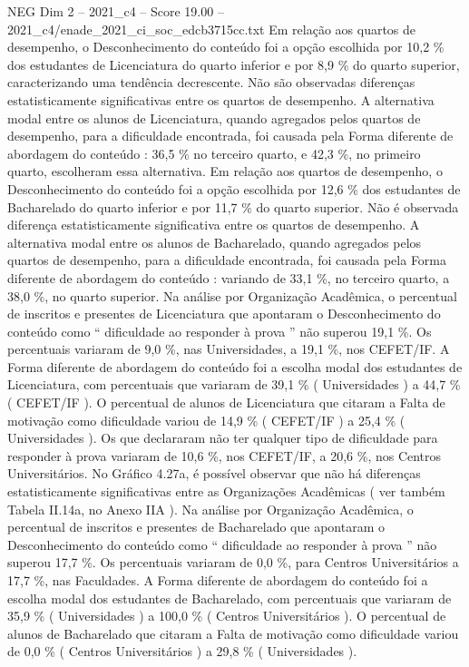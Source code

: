 \begin{textsample}{NEG Dim 2 – 2021\_c4 – Score 19.00 – 2021\_c4/enade\_2021\_ci\_soc\_edcb3715cc.txt}
Em relação aos quartos de desempenho, o Desconhecimento do conteúdo foi a opção escolhida por 10,2 \% dos estudantes de Licenciatura do quarto inferior e por 8,9 \% do quarto superior, caracterizando uma tendência decrescente.
Não são observadas diferenças estatisticamente significativas entre os quartos de desempenho.
A alternativa modal entre os alunos de Licenciatura, quando agregados pelos quartos de desempenho, para a dificuldade encontrada, foi causada pela Forma diferente de abordagem do conteúdo : 36,5 \% no terceiro quarto, e 42,3 \%, no primeiro quarto, escolheram essa alternativa.
Em relação aos quartos de desempenho, o Desconhecimento do conteúdo foi a opção escolhida por 12,6 \% dos estudantes de Bacharelado do quarto inferior e por 11,7 \% do quarto superior.
Não é observada diferença estatisticamente significativa entre os quartos de desempenho.
A alternativa modal entre os alunos de Bacharelado, quando agregados pelos quartos de desempenho, para a dificuldade encontrada, foi causada pela Forma diferente de abordagem do conteúdo : variando de 33,1 \%, no terceiro quarto, a 38,0 \%, no quarto superior.
Na análise por Organização Acadêmica, o percentual de inscritos e presentes de Licenciatura que apontaram o Desconhecimento do conteúdo como “ dificuldade ao responder à prova ” não superou 19,1 \%.
Os percentuais variaram de 9,0 \%, nas Universidades, a 19,1 \%, nos CEFET/IF.
A Forma diferente de abordagem do conteúdo foi a escolha modal dos estudantes de Licenciatura, com percentuais que variaram de 39,1 \% ( Universidades ) a 44,7 \% ( CEFET/IF ).
O percentual de alunos de Licenciatura que citaram a Falta de motivação como dificuldade variou de 14,9 \% ( CEFET/IF ) a 25,4 \% ( Universidades ).
Os que declararam não ter qualquer tipo de dificuldade para responder à prova variaram de 10,6 \%, nos CEFET/IF, a 20,6 \%, nos Centros Universitários.
No Gráfico 4.27a, é possível observar que não há diferenças estatisticamente significativas entre as Organizações Acadêmicas ( ver também Tabela II.14a, no Anexo IIA ).
Na análise por Organização Acadêmica, o percentual de inscritos e presentes de Bacharelado que apontaram o Desconhecimento do conteúdo como “ dificuldade ao responder à prova ” não superou 17,7 \%.
Os percentuais variaram de 0,0 \%, para Centros Universitários a 17,7 \%, nas Faculdades.
A Forma diferente de abordagem do conteúdo foi a escolha modal dos estudantes de Bacharelado, com percentuais que variaram de 35,9 \% ( Universidades ) a 100,0 \% ( Centros Universitários ).
O percentual de alunos de Bacharelado que citaram a Falta de motivação como dificuldade variou de 0,0 \% ( Centros Universitários ) a 29,8 \% ( Universidades ).

\end{textsample}
